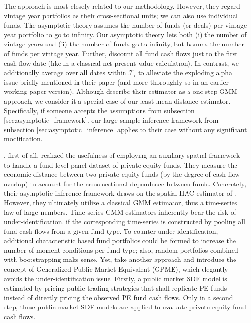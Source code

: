 \documentclass[12pt]{article}
\begin{document}
The \cite{DLP12} approach is most closely related to our methodology.
However, they regard vintage year portfolios as their cross-sectional units; we can also use individual funds.
The \cite{DLP12} asymptotic theory assumes the number of funds (or deals) per vintage year portfolio to go to infinity.
Our asymptotic theory lets both (i) the number of vintage years and (ii) the number of funds go to infinity, but bounds the number of funds per vintage year.
Further, \cite{DLP12} discount all fund cash flows just to the first cash flow date (like in a classical net present value calculation).
In contrast, we additionally average over all dates within $\mathcal{T}_{i}$ to alleviate the exploding alpha issue briefly mentioned in their paper (and more thoroughly so in an earlier working paper version).
Although \cite{DLP12} describe their estimator as a one-step GMM approach, we consider it a special case of our least-mean-distance estimator.
Specifically, if someone accepts the assumptions from subsection \ref{sec:asymptotic_framework}, our large sample inference framework from subsection \ref{sec:asymptotic_inference} applies to their case without any significant modification.

\cite{KN16}, first of all, realized the usefulness of employing an auxiliary spatial framework to handle a fund-level panel dataset of private equity funds.
They measure the economic distance between two private equity funds (by the degree of cash flow overlap) to account for the cross-sectional dependence between funds.
Concretely, their asymptotic inference framework draws on the spatial HAC estimator of \cite{C99}.
However, they ultimately utilize a classical GMM estimator, thus a time-series law of large numbers.
Time-series GMM estimators inherently bear the risk of under-identification, if the corresponding time-series is constructed by pooling all fund cash flows from a given fund type.
To counter under-identification, additional characteristic based fund portfolios could be formed to increase the number of moment conditions per fund type; also, random portfolios combined with bootstrapping make sense.
Yet, \cite{KN16} take another approach and introduce the concept of Generalized Public Market Equivalent (GPME), which elegantly avoids the under-identification issue.
Firstly, a public market SDF model is estimated by pricing public trading strategies that shall replicate PE funds instead of directly pricing the observed PE fund cash flows.
Only in a second step, these public market SDF models are applied to evaluate private equity fund cash flows.
\end{document}
